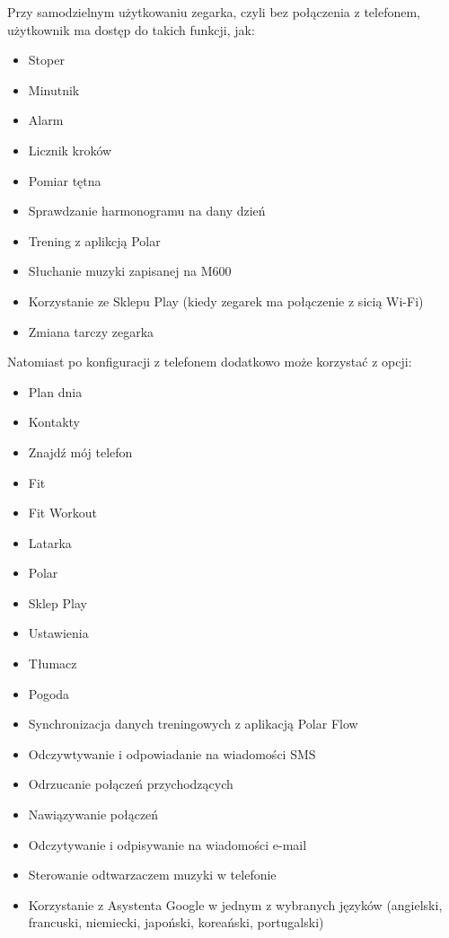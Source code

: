\documentclass[a4paper,12pt,reqno]{article}
\begin{document}
Przy samodzielnym użytkowaniu zegarka, czyli bez połączenia z telefonem, użytkownik ma dostęp do takich funkcji, jak:
\begin{itemize}
	\item Stoper
	\item Minutnik
	\item Alarm
	\item Licznik kroków
	\item Pomiar tętna
	\item Sprawdzanie harmonogramu na dany dzień
	\item Trening z aplikcją Polar
	\item Słuchanie muzyki zapisanej na M600
	\item Korzystanie ze Sklepu Play (kiedy zegarek ma połączenie z sicią Wi-Fi)
	\item Zmiana tarczy zegarka
\end{itemize}
Natomiast po konfiguracji z telefonem dodatkowo może korzystać z opcji:
\begin{itemize}
	\item Plan dnia
	\item Kontakty
	\item Znajdź mój telefon
	\item Fit
	\item Fit Workout
	\item Latarka
	\item Polar
	\item Sklep Play
	\item Ustawienia
	\item Tłumacz
	\item Pogoda
	\item Synchronizacja danych treningowych z aplikacją Polar Flow
	\item Odczywtywanie i odpowiadanie na wiadomości SMS
	\item Odrzucanie połączeń przychodzących
	\item Nawiązywanie połączeń
	\item Odczytywanie i odpisywanie na wiadomości e-mail
	\item Sterowanie odtwarzaczem muzyki w telefonie
	\item Korzystanie z Asystenta Google w jednym z wybranych języków (angielski, francuski, niemiecki, japoński, koreański, portugalski)
\end{itemize}
\end{document}
